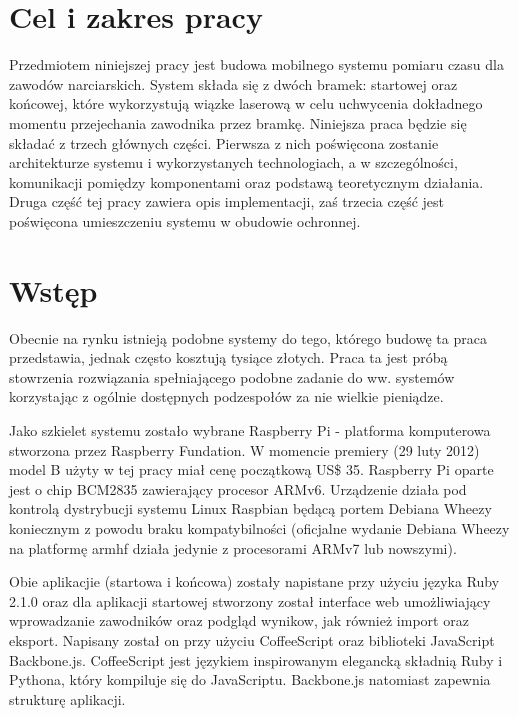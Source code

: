 \documentclass[11pt,a4paper, twoside]{article}
\begin{document}
 

\tableofcontents
\newpage	
\section{Cel i zakres pracy}
Przedmiotem niniejszej pracy jest budowa mobilnego systemu pomiaru czasu dla zawodów narciarskich. System składa się z dwóch bramek: startowej oraz końcowej, które wykorzystują wiązke laserową w celu uchwycenia dokładnego momentu przejechania zawodnika przez bramkę. Niniejsza praca będzie się składać z trzech głównych części. Pierwsza z nich poświęcona zostanie architekturze systemu i wykorzystanych technologiach, a w szczególności, komunikacji pomiędzy komponentami oraz podstawą teoretycznym działania. Druga część tej pracy zawiera opis implementacji, zaś trzecia część jest poświęcona umieszczeniu systemu w obudowie ochronnej.
\section{Wstęp}
Obecnie na rynku istnieją podobne systemy do tego, którego budowę ta praca przedstawia, jednak często kosztują tysiące złotych. Praca ta jest próbą stowrzenia rozwiązania spełniającego podobne zadanie do ww. systemów korzystając z ogólnie dostępnych podzespołów za nie wielkie pieniądze.

Jako szkielet systemu zostało wybrane Raspberry Pi - platforma komputerowa stworzona przez Raspberry Fundation. W momencie premiery (29 luty 2012) model B użyty w tej pracy miał cenę początkową US\$ 35. Raspberry Pi oparte jest o chip BCM2835 zawierający procesor ARMv6. Urządzenie działa pod kontrolą dystrybucji systemu Linux Raspbian będącą portem Debiana Wheezy koniecznym z powodu braku kompatybilności (oficjalne wydanie Debiana Wheezy na platformę armhf działa jedynie z procesorami ARMv7 lub nowszymi).

Obie aplikacjie (startowa i końcowa) zostały napistane przy użyciu języka Ruby 2.1.0 oraz dla aplikacji startowej stworzony został interface web umożliwiający wprowadzanie zawodników oraz podgląd wynikow, jak również import oraz eksport. Napisany został on przy użyciu CoffeeScript oraz biblioteki JavaScript Backbone.js. 
CoffeeScript jest językiem inspirowanym elegancką składnią Ruby i Pythona, który kompiluje się do JavaScriptu. Backbone.js natomiast zapewnia strukturę aplikacji.
\newline
\end{document}
